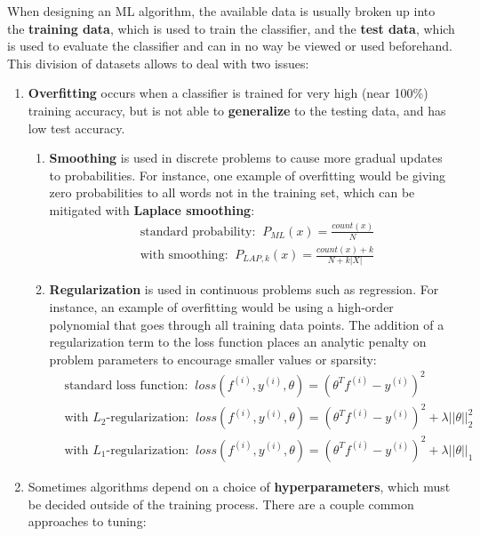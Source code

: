 \documentclass[11pt]{article}
\begin{document}
\noindent When designing an ML algorithm, the available data is usually broken up into the {\bf{training data}}, which is used to train the classifier, and the {\bf{test data}}, which is used to evaluate the classifier and can in no way be viewed or used beforehand. \noindent This division of datasets allows to deal with two issues:
\begin{enumerate}
    \item {\bf{Overfitting}} occurs when a classifier is trained for very high (near 100\%) training accuracy, but is not able to {\bf{generalize}} to the testing data, and has low test accuracy.
    \begin{enumerate}
        \item {\bf{Smoothing}} is used in discrete problems to cause more gradual updates to probabilities. For instance, one example of overfitting would be giving zero probabilities to all words not in the training set, which can be mitigated with {\bf{Laplace smoothing}}:
        \begin{align*}
        &\text{standard probability:} \; \; P_{ML}(x) = \frac{count(x)}{N} \\
        &\text{with smoothing:} \; \; P_{LAP, k}(x) = \frac{count(x) + k}{N + k|X|}
        \end{align*}
        \item {\bf{Regularization}} is used in continuous problems such as regression. For instance, an example of overfitting would be using a high-order polynomial that goes through all training data points. The addition of a regularization term to the loss function places an analytic penalty on problem parameters to encourage smaller values or sparsity:
        \begin{align*}
        &\text{standard loss function:} \; \; loss(f^{(i)}, y^{(i)}, \theta) = (\theta^T f^{(i)} - y^{(i)})^2 \\
        &\text{with $L_2$-regularization:} \; \; loss(f^{(i)}, y^{(i)}, \theta) = (\theta^T f^{(i)} - y^{(i)})^2 + \lambda ||\theta||_2^2 \\
        &\text{with $L_1$-regularization:} \; \; loss(f^{(i)}, y^{(i)}, \theta) = (\theta^T f^{(i)} - y^{(i)})^2 + \lambda ||\theta||_1
        \end{align*}
    \end{enumerate}
    \item Sometimes algorithms depend on a choice of {\bf{hyperparameters}}, which must be decided outside of the training process. There are a couple common approaches to tuning:

\end{enumerate}
\end{document}
